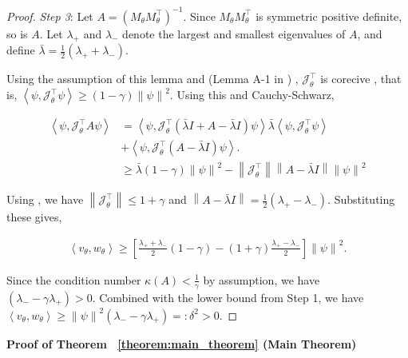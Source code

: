 \documentclass[letterpaper, 10 pt, conference]{ieeeconf}  %
\newcommand{\Jcal}{\mathcal{J}}
\newcommand{\T}{^{\top}}
\newcommand{\norm}[1]{\left\lVert#1\right\rVert}
\newcommand{\inner}[2]{\left\langle #1, #2 \right\rangle}
\begin{document}
\begin{proof}
\textit{Step 3}: Let $A = (M_\theta M_\theta^\top)^{-1}$. Since $M_\theta M_\theta^\top$ is symmetric positive definite, so is $A$. Let $\lambda_{+}$ and $\lambda_{-}$ denote the largest and smallest eigenvalues of $A$, and define $\bar{\lambda} = \frac{1}{2}(\lambda_{+} + \lambda_{-})$.

Using the assumption of this lemma and (Lemma A-1 in \cite{fung2022jfb}) ,  $\Jcal_\theta\T$ is corecive , that is,  $\inner{\psi}{\Jcal_\theta\T\psi} \geq (1-\gamma)\norm{\psi}^2$. Using this and Cauchy-Schwarz,
\begin{small}
\begin{align*}
\inner{\psi}{\Jcal_\theta\T A\psi} &= \inner{\psi}{\Jcal_\theta\T(\bar{\lambda}I + A - \bar{\lambda}I)\psi} \bar{\lambda}\inner{\psi}{\Jcal_\theta\T\psi} 
\\
&+ \inner{\psi}{\Jcal_\theta\T(A - \bar{\lambda}I)\psi}. \\
&\geq \bar{\lambda}(1-\gamma)\norm{\psi}^2 - \norm{\Jcal_\theta\T}\norm{A - \bar{\lambda}I}\norm{\psi}^2 
\end{align*}
\end{small}
Using \cite[Lemmas A-1 and A-2]{fung2022jfb}, we have $\norm{\Jcal_\theta\T} \leq 1+\gamma$ and $\norm{A - \bar{\lambda}I} = \frac{1}{2}(\lambda_{+} - \lambda_{-})$. Substituting these gives,
\begin{small}
\begin{align*}
\inner{v_\theta}{w_\theta} \geq \left[ \frac{\lambda_{+} + \lambda_{-}}{2}(1-\gamma) - (1+\gamma)\frac{\lambda_{+} - \lambda_{-}}{2} \right] \norm{\psi}^2 .
\end{align*}
\end{small}
Since the condition number $\kappa(A) < \frac{1}{\gamma}$ by assumption, we have $(\lambda_{-} - \gamma\lambda_{+}) > 0$. Combined with the lower bound from Step 1, we have
$\inner{v_\theta}{w_\theta} \geq \norm{\psi}^2(\lambda_{-} - \gamma\lambda_{+}) =: \delta^2 > 0.$
\end{proof}
\textbf{Proof of Theorem ~\ref{theorem:main_theorem} (Main Theorem)}
\noindent
\textit{}
\end{document}
